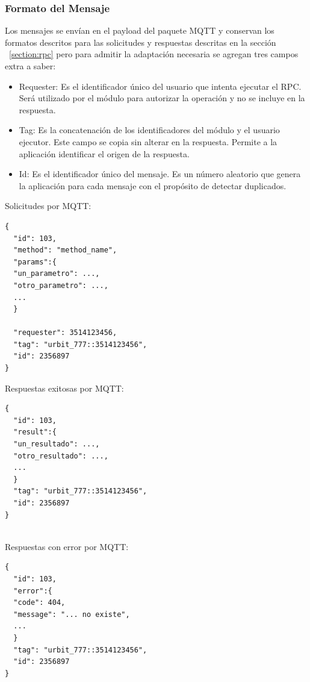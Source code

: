 \subsubsection{Formato del Mensaje}
Los mensajes se envían en el payload del paquete MQTT y conservan los formatos descritos para las solicitudes y respuestas descritas en la sección ~\ref{section:rpc} pero para admitir la adaptación necesaria se agregan tres campos extra a saber:
\begin{itemize}
	\item Requester: Es el identificador único del usuario que intenta ejecutar el RPC. Será utilizado por el módulo para autorizar la operación y no se incluye en la respuesta.
	\item Tag: Es la concatenación de los identificadores del módulo y el usuario ejecutor. Este campo se copia sin alterar en la respuesta. Permite a la aplicación identificar el origen de la respuesta.
	\item Id: Es el identificador único del mensaje. Es un número aleatorio que genera la aplicación para cada mensaje con el propósito de detectar duplicados.
\end{itemize}

\begin{multicols}{3} %
	
	{\small Solicitudes por MQTT:}
	\begin{lstlisting}
{
  "id": 103,
  "method": "method_name",
  "params":{
  "un_parametro": ...,
  "otro_parametro": ...,
  ...
  }

  "requester": 3514123456,
  "tag": "urbit_777::3514123456",
  "id": 2356897
}
	\end{lstlisting}
	
	\columnbreak %
	
	{\small Respuestas exitosas por MQTT:}
	\begin{lstlisting}
{
  "id": 103,
  "result":{
  "un_resultado": ...,
  "otro_resultado": ...,
  ...
  }
  "tag": "urbit_777::3514123456",
  "id": 2356897
}
	
	\end{lstlisting}
	
	\columnbreak %
	
	{\small Respuestas con error por MQTT:}
	\begin{lstlisting}
{
  "id": 103,
  "error":{
  "code": 404,
  "message": "... no existe",
  ...
  }
  "tag": "urbit_777::3514123456",
  "id": 2356897
}
	
	\end{lstlisting}
	
\end{multicols}

